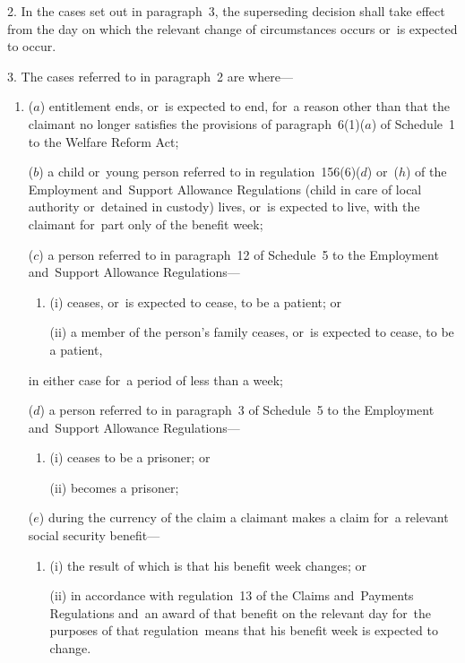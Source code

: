 \documentclass[12pt,a4paper]{article}
\begin{document}
\medskip

2.  In the cases set out in paragraph~3, the superseding decision shall take effect from the day on which the relevant change of circumstances occurs or~is expected to occur.

\medskip

3.  The cases referred to in paragraph~2 are where—
\begin{enumerate}\item[]
($a$) entitlement ends, or~is expected to end, for~a reason other than that the claimant no longer satisfies the provisions of paragraph~6(1)($a$)  of Schedule~1 to the Welfare Reform Act;

($b$) a child or~young person referred to in regulation~156(6)($d$)  or~($h$)  of the Employment and~Support Allowance Regulations (child in care of local authority or~detained in custody) lives, or~is expected to live, with the claimant for~part only of the benefit week;

($c$) a person referred to in paragraph~12 of Schedule~5 to the Employment and~Support Allowance Regulations—
\begin{enumerate}\item[]
(i) ceases, or~is expected to cease, to be a patient; or

(ii) a member of the person’s family ceases, or~is expected to cease, to be a patient,
\end{enumerate}
in either case for~a period of less than a week;

($d$) a person referred to in paragraph~3 of Schedule~5 to the Employment and~Support Allowance Regulations—
\begin{enumerate}\item[]
(i) ceases to be a prisoner; or

(ii) becomes a prisoner;
\end{enumerate}

($e$) during the currency of the claim a claimant makes a claim for~a relevant social security benefit—
\begin{enumerate}\item[]
(i) the result of which is that his benefit week changes; or

(ii) in accordance with regulation~13 of the Claims and~Payments Regulations and~an award of that benefit on the relevant day for~the purposes of that regulation~means that his benefit week is expected to change.
\end{enumerate}
\end{enumerate}
\end{document}
